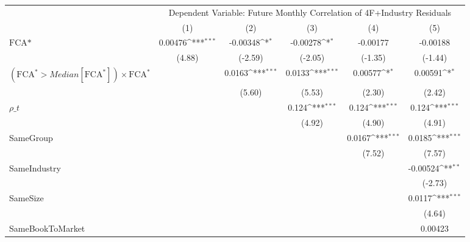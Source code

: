 {
\def\sym#1{\ifmmode^{#1}\else\(^{#1}\)\fi}
\begin{tabular}{l*{5}{c}}
\hline\hline
                &\multicolumn{5}{c}{Dependent Variable: Future Monthly Correlation of 4F+Industry Residuals}   \\\cmidrule(lr){2-6}
                &\multicolumn{1}{c}{(1)}         &\multicolumn{1}{c}{(2)}         &\multicolumn{1}{c}{(3)}         &\multicolumn{1}{c}{(4)}         &\multicolumn{1}{c}{(5)}         \\
\hline
$ \text{FCA*} $ &  0.00476\sym{***}& -0.00348\sym{*}  & -0.00278\sym{*}  & -0.00177         & -0.00188         \\
                &   (4.88)         &  (-2.59)         &  (-2.05)         &  (-1.35)         &  (-1.44)         \\
[1em]
 $ (\text{FCA}^* > Median[\text{FCA}^*]) \times {\text{FCA} ^*}  $ &                  &   0.0163\sym{***}&   0.0133\sym{***}&  0.00577\sym{*}  &  0.00591\sym{*}  \\
                &                  &   (5.60)         &   (5.53)         &   (2.30)         &   (2.42)         \\
[1em]
 $ {\rho\_t} $   &                  &                  &    0.124\sym{***}&    0.124\sym{***}&    0.124\sym{***}\\
                &                  &                  &   (4.92)         &   (4.90)         &   (4.91)         \\
[1em]
SameGroup       &                  &                  &                  &   0.0167\sym{***}&   0.0185\sym{***}\\
                &                  &                  &                  &   (7.52)         &   (7.57)         \\
[1em]
SameIndustry    &                  &                  &                  &                  & -0.00524\sym{**} \\
                &                  &                  &                  &                  &  (-2.73)         \\
[1em]
SameSize        &                  &                  &                  &                  &   0.0117\sym{***}\\
                &                  &                  &                  &                  &   (4.64)         \\
[1em]
SameBookToMarket&                  &                  &                  &                  &  0.00423         \\

\end{tabular}}
